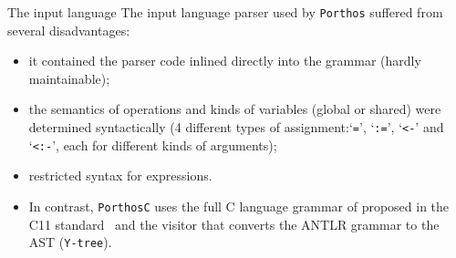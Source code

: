 \documentclass{beamer}
\begin{document}
\begin{frame}{The input language}
The input language parser used by \texttt{Porthos} suffered from several disadvantages:
\begin{itemize}
\item it contained the parser code inlined directly into the grammar (hardly maintainable);
\item the semantics of operations and kinds of variables (global or shared) were determined syntactically (4 different types of assignment:`\texttt{=}', `\texttt{:=}', `\texttt{<-}' and `\texttt{<:-}', each for different kinds of arguments);
\item restricted syntax for expressions.
\item In contrast, \texttt{PorthosC} uses the full C language grammar of proposed in the C11 standard~\cite{jtc2011sc22} and the visitor that converts the ANTLR grammar to the AST (\texttt{Y-tree}).
\end{itemize}

\end{frame}
\end{document}
